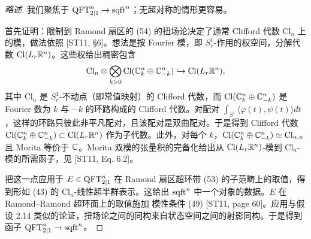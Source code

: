 \begin{proof}[略述]
我们聚焦于 $\operatorname{QFT}^n_{2|1}\to\operatorname{sqft}^n$；无超对称的情形更容易。

首先证明：限制到 Ramond 扇区的 (54) 的扭场论决定了通常 Clifford 代数 $\mathrm{Cl}_n$ 上的模，做法依照 [ST11, §6]。想法是按 Fourier 模，即 $S^1_r$-作用的权空间，分解代数 $\mathrm{Cl}(L_r\mathbb{R}^n)$。这些权给出稠密包含
\[
\mathrm{Cl}_n\otimes\bigotimes_{k>0}\mathrm{Cl}(\mathbb{C}^n_k\oplus\mathbb{C}^n_{-k})\hookrightarrow\mathrm{Cl}(L_r\mathbb{R}^n),
\]
其中 $\mathrm{Cl}_n$ 是 $S^1_r$-不动点（即常值映射）的 Clifford 代数，而 $\mathrm{Cl}(\mathbb{C}^n_k\oplus\mathbb{C}^n_{-k})$ 是 Fourier 数为 $k$ 与 $-k$ 的环路构成的 Clifford 代数。对配对 $\int_{S^1}\langle\varphi(t),\psi(t)\rangle dt$，这样的环路只彼此非平凡配对，且该配对是双曲配对。于是得到 Clifford 代数 $\mathrm{Cl}(\mathbb{C}^n_k\oplus\mathbb{C}^n_{-k})\subset\mathrm{Cl}(L_r\mathbb{R}^n)$ 作为子代数。此外，对每个 $k$，$\mathrm{Cl}(\mathbb{C}^n_k\oplus\mathbb{C}^n_{-k})\simeq\mathrm{Cl}_{n,n}$ 且 Morita 等价于 $\mathbb{C}$。Morita 双模的张量积的完备化给出从 $\mathrm{Cl}(L_r\mathbb{R}^n)$-模到 $\mathrm{Cl}_n$-模的所需函子，见 [ST11, Eq. 6.2]。

把这一点应用于 $E\in\operatorname{QFT}^n_{2|1}$ 在 Ramond 扇区超环带 (53) 的子范畴上的取值，得到形如 (43) 的 $\mathrm{Cl}_n$-线性超半群表示。这给出 $\operatorname{sqft}^n$ 中一个对象的数据。$E$ 在 Ramond–Ramond 超环面上的取值施加
模性条件 (49) [ST11, page 60]。应用与假设 2.14 类似的论证，扭场论之间的同构来自状态空间之间的射影同构。于是得到函子 $\operatorname{QFT}^n_{2|1}\to\operatorname{sqft}^n$。
\end{proof}


